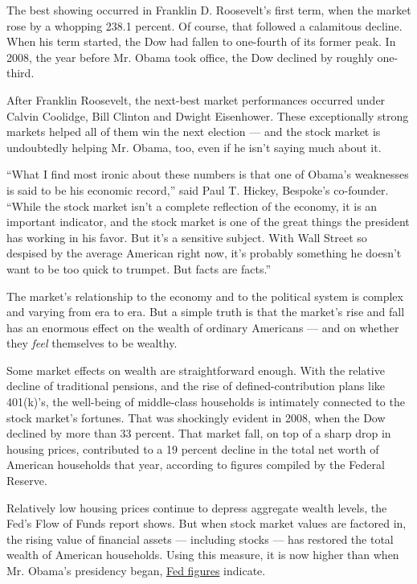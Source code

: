 The best showing occurred in Franklin D. Roosevelt's first term, when
the market rose by a whopping 238.1 percent. Of course, that followed a
calamitous decline. When his term started, the Dow had fallen to
one-fourth of its former peak. In 2008, the year before Mr. Obama took
office, the Dow declined by roughly one-third.

After Franklin Roosevelt, the next-best market performances occurred
under Calvin Coolidge, Bill Clinton and Dwight Eisenhower. These
exceptionally strong markets helped all of them win the next election
--- and the stock market is undoubtedly helping Mr. Obama, too, even if
he isn't saying much about it.

``What I find most ironic about these numbers is that one of Obama's
weaknesses is said to be his economic record,'' said Paul T. Hickey,
Bespoke's co-founder. ``While the stock market isn't a complete
reflection of the economy, it is an important indicator, and the stock
market is one of the great things the president has working in his
favor. But it's a sensitive subject. With Wall Street so despised by the
average American right now, it's probably something he doesn't want to
be too quick to trumpet. But facts are facts.''

The market's relationship to the economy and to the political system is
complex and varying from era to era. But a simple truth is that the
market's rise and fall has an enormous effect on the wealth of ordinary
Americans --- and on whether they \emph{feel} themselves to be wealthy.

Some market effects on wealth are straightforward enough. With the
relative decline of traditional pensions, and the rise of
defined-contribution plans like 401(k)'s, the well-being of middle-class
households is intimately connected to the stock market's fortunes. That
was shockingly evident in 2008, when the Dow declined by more than 33
percent. That market fall, on top of a sharp drop in housing prices,
contributed to a 19 percent decline in the total net worth of American
households that year, according to figures compiled by the Federal
Reserve.

Relatively low housing prices continue to depress aggregate wealth
levels, the Fed's Flow of Funds report shows. But when stock market
values are factored in, the rising value of financial assets ---
including stocks --- has restored the total wealth of American
households. Using this measure, it is now higher than when Mr. Obama's
presidency began,
\href{http://www.federalreserve.gov/releases/z1/Current/z1.pdf}{Fed
figures} indicate.

